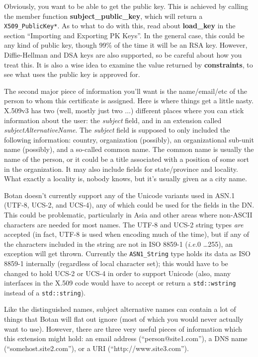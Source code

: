 \documentclass{article}
\newcommand{\function}[1]{\textbf{#1}}
\newcommand{\type}[1]{\texttt{#1}}
\newcommand{\ie}[0]{\emph{i.e.}}
\begin{document}
Obviously, you want to be able to get the public key. This is achieved by
calling the member function \function{subject\_public\_key}, which will return
a \type{X509\_PublicKey*}. As to what to do with this, read about
\function{load\_key} in the section ``Importing and Exporting PK Keys''. In the
general case, this could be any kind of public key, though 99\% of the time it
will be an RSA key. However, Diffie-Hellman and DSA keys are also supported, so
be careful about how you treat this. It is also a wise idea to examine the
value returned by \function{constraints}, to see what uses the public key is
approved for.

The second major piece of information you'll want is the name/email/etc of the
person to whom this certificate is assigned. Here is where things get a little
nasty. X.509v3 has two (well, mostly just two $\ldots$) different places where
you can stick information about the user: the \emph{subject} field, and in an
extension called \emph{subjectAlternativeName}. The \emph{subject} field is
supposed to only included the following information: country, organization
(possibly), an organizational sub-unit name (possibly), and a so-called common
name. The common name is usually the name of the person, or it could be a title
associated with a position of some sort in the organization. It may also
include fields for state/province and locality. What exactly a locality is,
nobody knows, but it's usually given as a city name.

Botan doesn't currently support any of the Unicode variants used in ASN.1
(UTF-8, UCS-2, and UCS-4), any of which could be used for the fields in the
DN. This could be problematic, particularly in Asia and other areas where
non-ASCII characters are needed for most names. The UTF-8 and UCS-2 string
types \emph{are} accepted (in fact, UTF-8 is used when encoding much of the
time), but if any of the characters included in the string are not in ISO
8859-1 (\ie 0 \ldots 255), an exception will get thrown. Currently the
\type{ASN1\_String} type holds its data as ISO 8859-1 internally (regardless
of local character set); this would have to be changed to hold UCS-2 or UCS-4
in order to support Unicode (also, many interfaces in the X.509 code would have
to accept or return a \type{std::wstring} instead of a \type{std::string}).

Like the distinguished names, subject alternative names can contain a lot of
things that Botan will flat out ignore (most of which you would never actually
want to use). However, there are three very useful pieces of information which
this extension might hold: an email address (``person@site1.com''), a DNS name
(``somehost.site2.com''), or a URI (``http://www.site3.com'').
\end{document}
